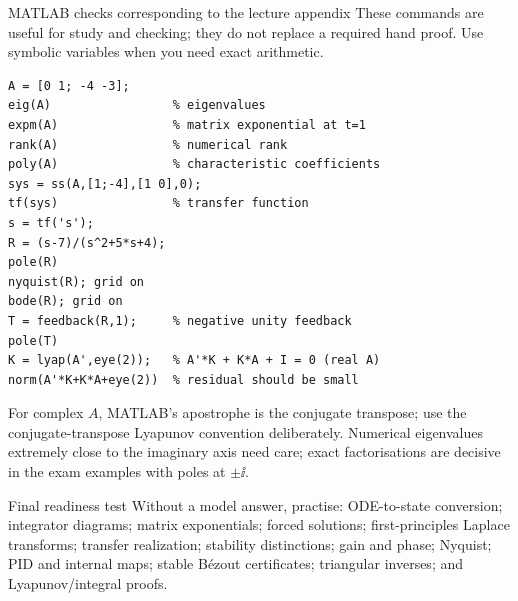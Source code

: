 \begin{concept}{MATLAB checks corresponding to the lecture appendix}
These commands are useful for study and checking; they do not replace a required hand proof. Use symbolic variables when you need exact arithmetic.
\begin{verbatim}
A = [0 1; -4 -3];
eig(A)                 % eigenvalues
expm(A)                % matrix exponential at t=1
rank(A)                % numerical rank
poly(A)                % characteristic coefficients
sys = ss(A,[1;-4],[1 0],0);
tf(sys)                % transfer function
s = tf('s');
R = (s-7)/(s^2+5*s+4);
pole(R)
nyquist(R); grid on
bode(R); grid on
T = feedback(R,1);     % negative unity feedback
pole(T)
K = lyap(A',eye(2));   % A'*K + K*A + I = 0 (real A)
norm(A'*K+K*A+eye(2))  % residual should be small
\end{verbatim}
For complex $A$, MATLAB's apostrophe is the conjugate transpose; use the conjugate-transpose Lyapunov convention deliberately. Numerical eigenvalues extremely close to the imaginary axis need care; exact factorisations are decisive in the exam examples with poles at $\pm\ii$.
\end{concept}
\begin{concept}{Final readiness test}
Without a model answer, practise: ODE-to-state conversion; integrator diagrams; matrix exponentials; forced solutions; first-principles Laplace transforms; transfer realization; stability distinctions; gain and phase; Nyquist; PID and internal maps; stable B\'ezout certificates; triangular inverses; and Lyapunov/integral proofs.
\end{concept}

